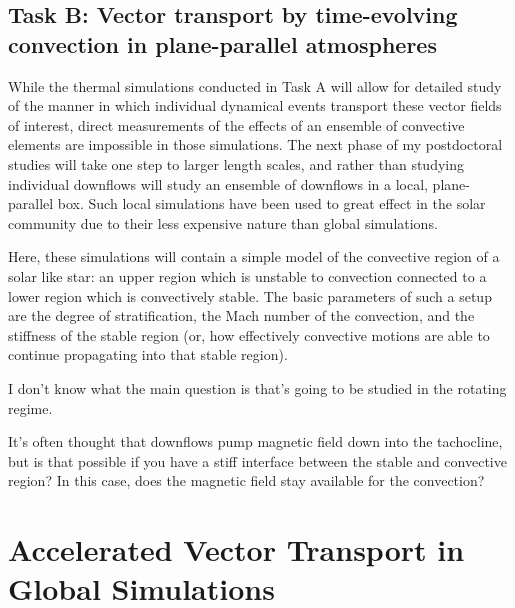 \documentclass[aasms,12pt]{article}
\begin{document}
\subsection{Task B: Vector transport by time-evolving convection in plane-parallel atmospheres}
While the thermal simulations conducted in Task A will allow for detailed study of the manner in which individual dynamical events transport these vector fields of interest, direct measurements of the effects of an ensemble of convective elements are impossible in those simulations.
The next phase of my postdoctoral studies will take one step to larger length scales, and rather than studying individual downflows will study an ensemble of downflows in a local, plane-parallel box.
Such local simulations have been used to great effect in the solar community due to their less expensive nature than global simulations.

Here, these simulations will contain a simple model of the convective region of a solar like star: an upper region which is unstable to convection connected to a lower region which is convectively stable.
The basic parameters of such a setup are the degree of stratification, the Mach number of the convection, and the stiffness of the stable region (or, how effectively convective motions are able to continue propagating into that stable region).

I don't know what the main question is that's going to be studied in the rotating regime.

It's often thought that downflows pump magnetic field down into the tachocline, but is that possible if you have a stiff interface between the stable and convective region?
In this case, does the magnetic field stay available for the convection?

\section{Accelerated Vector Transport in Global Simulations}
\label{sct:global_models}
\end{document}
